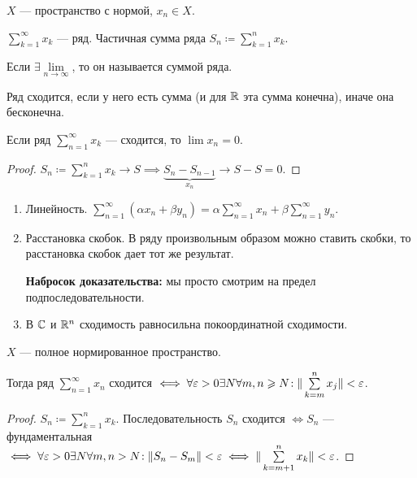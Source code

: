 \begin{definition}
    $X$ --- пространство с нормой,  $x_n \in X$.

     $\sum\limits_{k=1}^\infty x_k$ --- ряд. Частичная сумма ряда  $S_n \coloneqq \sum\limits_{k=1}^n x_k$.

     Если  $\exists \lim\limits_{n \to \infty}$, то он называется суммой ряда.

     Ряд сходится, если у него есть сумма (и для $\mathbb{R}$ эта сумма конечна), иначе она бесконечна.
\end{definition}
\begin{theorem}
    Если ряд $\sum\limits_{n=1}^\infty x_k$ --- сходится, то  $\lim x_n = 0$.
\end{theorem}
\begin{proof}
    $S_n \coloneqq \sum\limits_{k=1}^n x_k \to S \implies \underbrace{S_n - S_{n-1}}_{x_n} \to S - S = 0$.
\end{proof}
\begin{properties}
    \begin{enumerate}
        \item Линейность. $\sum\limits_{n=1}^\infty (\alpha x_n + \beta y_n) = \alpha \sum\limits_{n=1}^\infty x_n + \beta \sum\limits_{n=1}^\infty y_n$.
        \item Расстановка скобок. В ряду произвольным образом можно ставить скобки, то расстановка скобок дает тот же результат. 

            \textbf{Набросок доказательства:} мы просто смотрим на предел подпоследовательности.
        \item В  $\mathbb{C}$ и  $\mathbb{R}^n$ сходимость равносильна покоординатной сходимости.
    \end{enumerate}
\end{properties}
\begin{theorem}
    $X$ --- полное нормированное пространство.

    Тогда ряд  $\sum\limits_{n=1}^\infty x_n$ сходится  $\iff \forall \varepsilon > 0 \exists N \forall m,n \geqslant N\!: \| \sum\limits_{k=m}^n x_j \| < \varepsilon$.
\end{theorem}
\begin{proof}
    $S_n \coloneqq \sum\limits_{k=1}^n x_k$. Последовательность  $S_n$ сходится  $\iff S_n$ --- фундаментальная  $\iff \forall \varepsilon > 0 \exists N \forall m, n > N\!: \|S_n-S_m\| < \varepsilon \iff \| \sum\limits_{k=m+1}^n x_k \| < \varepsilon$.
\end{proof}

